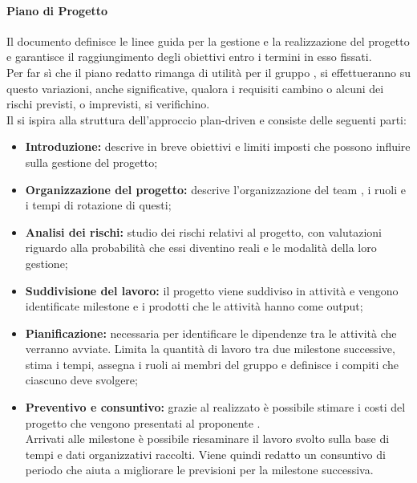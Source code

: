 \paragraph{Piano di Progetto}
Il documento \docNameVersionPdP{} definisce le linee guida per la gestione e la realizzazione del progetto e garantisce il raggiungimento degli obiettivi entro i termini in esso fissati.\\
Per far sì che il piano redatto rimanga di utilità per il gruppo \groupName{}, si effettueranno su questo variazioni, anche significative, qualora i requisiti cambino o alcuni dei rischi previsti, o imprevisti, si verifichino.\\
Il \docNameVersionPdP{} si ispira alla struttura dell'approccio plan-driven e consiste delle seguenti parti:
\begin{itemize}
	\item \textbf{Introduzione:} descrive in breve obiettivi e limiti imposti che possono influire sulla gestione del progetto;
	\item  \textbf{Organizzazione del progetto:} descrive l'organizzazione del team \groupName{}, i ruoli e i tempi di rotazione di questi;
	\item \textbf{Analisi dei rischi:} studio dei rischi relativi al progetto, con valutazioni riguardo alla probabilità che essi diventino reali e le modalità della loro gestione;
	\item \textbf{Suddivisione del lavoro:} il progetto viene suddiviso in attività e vengono identificate milestone e i prodotti che le attività hanno come output;
	\item \textbf{Pianificazione:} necessaria per identificare le dipendenze tra le attività che verranno avviate. Limita la quantità di lavoro tra due milestone successive, stima i tempi, assegna i ruoli ai membri del gruppo e definisce i compiti che ciascuno deve svolgere;
	\item \textbf{Preventivo e consuntivo:} grazie al \docNameVersionPdP{} realizzato è possibile stimare i costi del progetto che vengono presentati al proponente \proposerName{}.\\ 
	Arrivati alle milestone è possibile riesaminare il lavoro svolto sulla base di tempi e dati organizzativi raccolti. Viene quindi redatto un consuntivo di periodo che aiuta a migliorare le previsioni per la milestone successiva.
\end{itemize}
